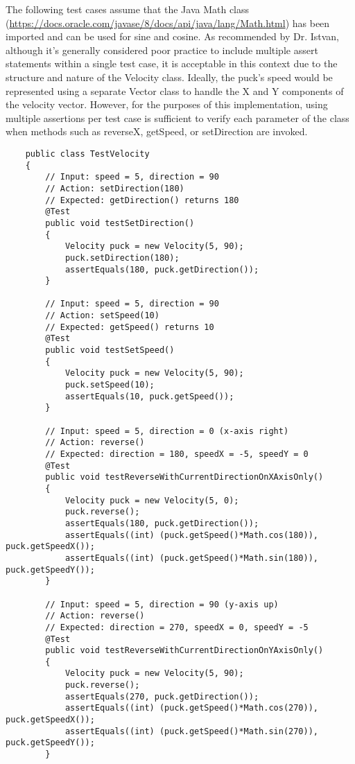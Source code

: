 \documentclass{article}
\begin{document}
The following test cases assume that the Java Math class (\url{https://docs.oracle.com/javase/8/docs/api/java/lang/Math.html}) has been imported and can be used for sine and cosine.
As recommended by Dr. Istvan, although it's generally considered poor practice to include multiple assert statements within a single test case, it is acceptable in this context due to the structure and nature of the Velocity class. Ideally, the puck’s speed would be represented using a separate Vector class to handle the X and Y components of the velocity vector. However, for the purposes of this implementation, using multiple assertions per test case is sufficient to verify each parameter of the class when methods such as reverseX, getSpeed, or setDirection are invoked.
\begin{lstlisting}
    public class TestVelocity
    {
        // Input: speed = 5, direction = 90
        // Action: setDirection(180)
        // Expected: getDirection() returns 180
        @Test
        public void testSetDirection()
        {
            Velocity puck = new Velocity(5, 90);
            puck.setDirection(180);
            assertEquals(180, puck.getDirection());
        }

        // Input: speed = 5, direction = 90
        // Action: setSpeed(10)
        // Expected: getSpeed() returns 10
        @Test
        public void testSetSpeed()
        {
            Velocity puck = new Velocity(5, 90);
            puck.setSpeed(10);
            assertEquals(10, puck.getSpeed());
        }

        // Input: speed = 5, direction = 0 (x-axis right)
        // Action: reverse()
        // Expected: direction = 180, speedX = -5, speedY = 0
        @Test
        public void testReverseWithCurrentDirectionOnXAxisOnly()
        {
            Velocity puck = new Velocity(5, 0);
            puck.reverse();
            assertEquals(180, puck.getDirection());
            assertEquals((int) (puck.getSpeed()*Math.cos(180)), puck.getSpeedX());
            assertEquals((int) (puck.getSpeed()*Math.sin(180)), puck.getSpeedY());
        }

        // Input: speed = 5, direction = 90 (y-axis up)
        // Action: reverse()
        // Expected: direction = 270, speedX = 0, speedY = -5
        @Test
        public void testReverseWithCurrentDirectionOnYAxisOnly()
        {
            Velocity puck = new Velocity(5, 90);
            puck.reverse();
            assertEquals(270, puck.getDirection());
            assertEquals((int) (puck.getSpeed()*Math.cos(270)), puck.getSpeedX());
            assertEquals((int) (puck.getSpeed()*Math.sin(270)), puck.getSpeedY());
        }


\end{lstlisting}
\end{document}

